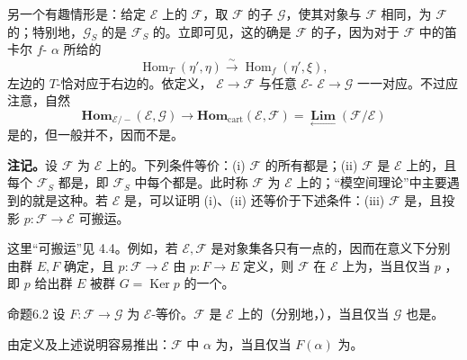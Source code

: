 另一个有趣情形是：给定 $\mathcal E$ 上的 $\mathcal F$，取 $\mathcal F$ 的子 $\mathcal G$，使其对象与 $\mathcal F$ 相同，为 $\mathcal F$ 的；特别地，$\mathcal G_S$ 的是 $\mathcal F_S$ 的。立即可见，这的确是 $\mathcal F$ 的子，因为对于 $\mathcal F$ 中的笛卡尔 $f$- $\alpha$ 所给的
\[
 \operatorname{Hom}_T(\eta',\eta)\xrightarrow{\sim}\operatorname{Hom}_f(\eta',\xi),
\]
左边的 $T$-恰对应于右边的。依定义， $\mathcal E\to\mathcal F$ 与任意 $\mathcal E$- $\mathcal E\to\mathcal G$ 一一对应。不过应注意，自然
\[
 \mathbf{Hom}_{\mathcal E/-}(\mathcal E,\mathcal G)\longrightarrow
 \mathbf{Hom}_{\mathrm{cart}}(\mathcal E,\mathcal F)
 =\mathop{\mathbf{Lim}}\limits_{\longleftarrow}(\mathcal F/\mathcal E)
\]
是的，但一般并不，因而不是。

\textbf{注记。}设 $\mathcal F$ 为 $\mathcal E$ 上的。下列条件等价：(i) $\mathcal F$ 的所有都是；(ii) $\mathcal F$ 是 $\mathcal E$ 上的，且每个 $\mathcal F_S$ 都是，即 $\mathcal F_S$ 中每个都是。此时称 $\mathcal F$ 为 $\mathcal E$ 上的；“模空间理论”中主要遇到的就是这种。若 $\mathcal E$ 是，可以证明 (i)、(ii) 还等价于下述条件：(iii) $\mathcal F$ 是，且投影 $p:\mathcal F\to\mathcal E$ 可搬运。

这里“可搬运”见 4.4。例如，若 $\mathcal E,\mathcal F$ 是对象集各只有一点的，因而在意义下分别由群 $E,F$ 确定，且 $p:\mathcal F\to\mathcal E$ 由 $p:F\to E$ 定义，则 $\mathcal F$ 在 $\mathcal E$ 上为，当且仅当 $p$ ，即 $p$ 给出群 $E$ 被群 $G=\operatorname{Ker}p$ 的一个。

\begin{SGAresult}{命题}{6.2}
设 $F:\mathcal F\to\mathcal G$ 为 $\mathcal E$-等价。$\mathcal F$ 是 $\mathcal E$ 上的（分别地，），当且仅当 $\mathcal G$ 也是。
\end{SGAresult}
由定义及上述说明容易推出：$\mathcal F$ 中 $\alpha$ 为，当且仅当 $F(\alpha)$ 为。

